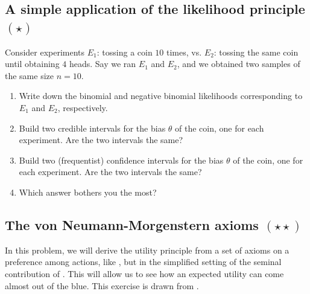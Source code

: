 \documentclass{article}
\begin{document}
\subsection{A simple application of the likelihood principle $(\star)$}
Consider experiments $E_1$: tossing a coin $10$ times, vs. $E_2$: tossing the same coin until obtaining $4$ heads. Say we ran $E_1$ and $E_2$, and we obtained two samples of the same size $n=10$.
\begin{enumerate}
\item Write down the binomial and negative binomial likelihoods corresponding to $E_1$ and $E_2$, respectively.
\item Build two credible intervals for the bias $\theta$ of the coin, one for each experiment. Are the two intervals the same?
\item Build two (frequentist) confidence intervals for the bias $\theta$ of the coin, one for each experiment. Are the two intervals the same?
\item Which answer bothers you the most?
\end{enumerate}

\subsection{The von Neumann-Morgenstern axioms $(\star\star)$}
In this problem, we will derive the utility principle from a set of axioms on a preference among actions, like \cite{Sav54}, but in the simplified setting of the seminal contribution of \cite{VoMo44}.
This will allow us to see how an expected utility can come almost out of the blue.
This exercise is drawn from \citep[Section 3.4.2]{PaIn09}.
\end{document}
